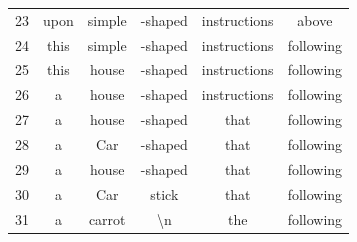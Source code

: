\documentclass[11pt]{article}
\begin{document}
\begin{table}[htbp]
{\begin{tabular}{c| c c c c c}
23 &  upon &  simple & -shaped &  instructions &  above \\
24 &  this &  simple & -shaped &  instructions &  following \\
25 &  this &  house & -shaped &  instructions &  following \\
26 &  a &  house & -shaped &  instructions &  following \\
27 &  a &  house & -shaped &  that &  following \\
28 &  a &  Car & -shaped &  that &  following \\
29 &  a &  house & -shaped &  that &  following \\
30 &  a &  Car &  stick &  that &  following \\
31 &  a &  carrot & \textbackslash{}n &  the &  following \\
\bottomrule
    \end{tabular}
}
\end{table}
\end{document}
